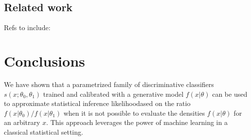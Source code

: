 \documentclass[11pt, oneside]{article}   	%
\begin{document}


\subsection{Related work}

Refs to include:
\cite{ClaytonScott,AndrewY.Ng,SamT.Roweis,EricP.Xing,SujaySanghavi,BiancaZadrozny,Zadrozny2001,TommiJaakkola}

\cite{JMLR:v14:tong13a}


\section{Conclusions}

We have shown that a parametrized family of discriminative classifiers $s(x; \theta_0, \theta_1)$ trained and calibrated with a generative model $f(x|\theta)$ can be used to approximate statistical inference likelihoodased on the  ratio $f(x|\theta_0)/f(x|\theta_1)$ when it is not possible to evaluate the densities $f(x|\theta)$ for an arbitrary $x$. This approach leverages the power of machine learning in a classical statistical setting.
\end{document}
